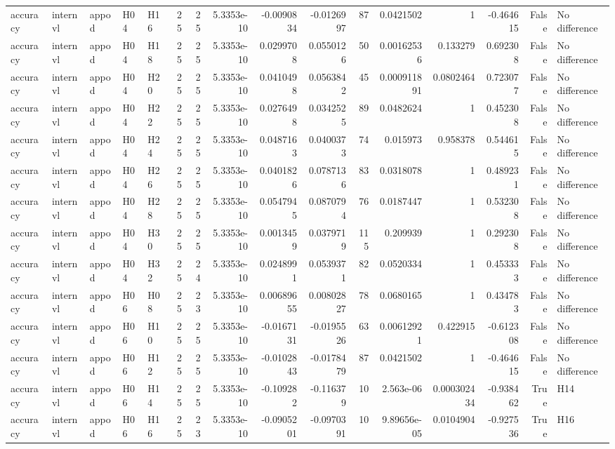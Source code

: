 \begin{longtable}{lllllrrrrrrrrrrl}
accuracy & internvl & appod & H04 & H16 & 25 & 25 & 5.3353e-10 & -0.0090834 & -0.0126997 & 87 & 0.0421502 & 1 & -0.464615 & False & No difference \\
accuracy & internvl & appod & H04 & H18 & 25 & 25 & 5.3353e-10 & 0.0299708 & 0.0550126 & 50 & 0.00162536 & 0.133279 & 0.692308 & False & No difference \\
accuracy & internvl & appod & H04 & H20 & 25 & 25 & 5.3353e-10 & 0.0410498 & 0.0563842 & 45 & 0.000911891 & 0.0802464 & 0.723077 & False & No difference \\
accuracy & internvl & appod & H04 & H22 & 25 & 25 & 5.3353e-10 & 0.0276498 & 0.0342525 & 89 & 0.0482624 & 1 & 0.452308 & False & No difference \\
accuracy & internvl & appod & H04 & H24 & 25 & 25 & 5.3353e-10 & 0.0487163 & 0.0400373 & 74 & 0.015973 & 0.958378 & 0.544615 & False & No difference \\
accuracy & internvl & appod & H04 & H26 & 25 & 25 & 5.3353e-10 & 0.0401826 & 0.0787136 & 83 & 0.0318078 & 1 & 0.489231 & False & No difference \\
accuracy & internvl & appod & H04 & H28 & 25 & 25 & 5.3353e-10 & 0.0547945 & 0.0870794 & 76 & 0.0187447 & 1 & 0.532308 & False & No difference \\
accuracy & internvl & appod & H04 & H30 & 25 & 25 & 5.3353e-10 & 0.0013459 & 0.0379719 & 115 & 0.209939 & 1 & 0.292308 & False & No difference \\
accuracy & internvl & appod & H04 & H32 & 25 & 24 & 5.3353e-10 & 0.0248991 & 0.0539371 & 82 & 0.0520334 & 1 & 0.453333 & False & No difference \\
accuracy & internvl & appod & H06 & H08 & 25 & 23 & 5.3353e-10 & 0.00689655 & 0.00802827 & 78 & 0.0680165 & 1 & 0.434783 & False & No difference \\
accuracy & internvl & appod & H06 & H10 & 25 & 25 & 5.3353e-10 & -0.0167131 & -0.0195526 & 63 & 0.00612921 & 0.422915 & -0.612308 & False & No difference \\
accuracy & internvl & appod & H06 & H12 & 25 & 25 & 5.3353e-10 & -0.0102843 & -0.0178479 & 87 & 0.0421502 & 1 & -0.464615 & False & No difference \\
accuracy & internvl & appod & H06 & H14 & 25 & 25 & 5.3353e-10 & -0.109282 & -0.116379 & 10 & 2.563e-06 & 0.000302434 & -0.938462 & True & H14 \\
accuracy & internvl & appod & H06 & H16 & 25 & 23 & 5.3353e-10 & -0.0905201 & -0.0970391 & 10 & 9.89656e-05 & 0.0104904 & -0.927536 & True & H16 \\

\end{longtable}
